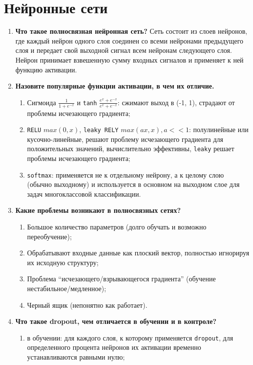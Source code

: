 \documentclass{article}
\begin{document}
\section{Нейронные сети}
\begin{enumerate}
    \item \textbf{Что такое полносвязная нейронная сеть?} Сеть состоит из слоев нейронов, где каждый нейрон одного слоя соединен со всеми нейронами предыдущего слоя и передает свой выходной сигнал всем нейронам следующего слоя. Нейрон принимает взвешенную сумму входных сигналов и применяет к ней функцию активации.
    \item \textbf{Назовите популярные функции активации, в чем их отличие.} 
    \begin{enumerate}
        \item Сигмоида $\frac{1}{1+e^{-x}}$ и  \texttt{tanh} $\frac{e^x+e^{-x}}{e^x+e^{-x}}$: сжимают выход в (-1, 1), страдают от проблемы исчезающего градиента; 
        \item \texttt{RELU} $max(0,x)$, \texttt{leaky RELY} $max(ax,x), a <<1$: полулинейные или кусочно-линейные, решают проблему исчезающего градиента для положительных значений, вычислительно эффективны, \texttt{leaky} решает проблемы исчезающего градиента; 
        \item \texttt{softmax}: применяется не к отдельному нейрону, а к целому слою (обычно выходному) и используется в основном на выходном слое для задач многоклассовой классификации.
    \end{enumerate}
    \item \textbf{Какие проблемы возникают в полносвязных сетях?} 
    \begin{enumerate}
        \item Большое количество параметров (долго обучать и возможно переобучение); 
        \item Обрабатывают входные данные как плоский вектор, полностью игнорируя их исходную структуру; 
        \item Проблема ``исчезающего/взрывающегося градиента'' (обучение нестабильное/медленное); 
        \item Черный ящик (непонятно как работает).
    \end{enumerate}
    \item \textbf{Что такое dropout, чем отличается в обучении и в контроле?} 
    \begin{enumerate}
        \item в обучении: для каждого слоя, к которому применяется \texttt{dropout}, для определенного процента нейронов их активации временно устанавливаются равными нулю; 

\end{enumerate}
\end{enumerate}
\end{document}

